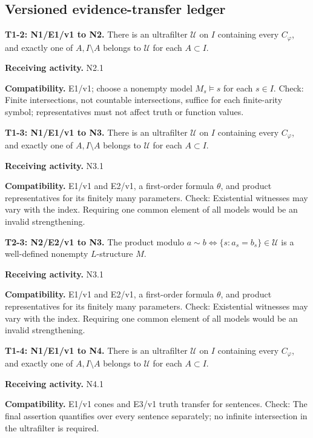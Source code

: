 \documentclass[preprint,12pt,aps,pra,showkeys,amsmath,amssymb,superscriptaddress,floatfix]{revtex4-2}
\theoremstyle{definition}
\theoremstyle{remark}
\newcommand{\field}[2]{\par\smallskip\noindent\textbf{#1.} #2\par}
\begin{document}
\clearpage\subsection{Versioned evidence-transfer ledger}

\begingroup\small\linespread{1.05}\selectfont

\field{T1-2: N1/E1/v1 to N2}{There is an ultrafilter \(\mathcal U\) on \(I\) containing every
\(C_\varphi\), and exactly one of \(A,I\setminus A\) belongs to
\(\mathcal U\) for each \(A\subset I\).}

\field{Receiving activity}{N2.1}

\field{Compatibility}{E1/v1; choose a nonempty model \(M_s\models s\) for each \(s\in I\).
Check: Finite intersections, not countable intersections, suffice for
each finite-arity symbol; representatives must not affect truth or
function values.}

\field{T1-3: N1/E1/v1 to N3}{There is an ultrafilter \(\mathcal U\) on \(I\) containing every
\(C_\varphi\), and exactly one of \(A,I\setminus A\) belongs to
\(\mathcal U\) for each \(A\subset I\).}

\field{Receiving activity}{N3.1}

\field{Compatibility}{E1/v1 and E2/v1, a first-order formula \(\theta\), and product
representatives for its finitely many parameters. Check: Existential
witnesses may vary with the index. Requiring one common element of all
models would be an invalid strengthening.}

\field{T2-3: N2/E2/v1 to N3}{The product modulo \(a\sim b\iff\{s:a_s=b_s\}\in\mathcal U\) is a
well-defined nonempty \(L\)-structure \(M\).}

\field{Receiving activity}{N3.1}

\field{Compatibility}{E1/v1 and E2/v1, a first-order formula \(\theta\), and product
representatives for its finitely many parameters. Check: Existential
witnesses may vary with the index. Requiring one common element of all
models would be an invalid strengthening.}

\field{T1-4: N1/E1/v1 to N4}{There is an ultrafilter \(\mathcal U\) on \(I\) containing every
\(C_\varphi\), and exactly one of \(A,I\setminus A\) belongs to
\(\mathcal U\) for each \(A\subset I\).}

\field{Receiving activity}{N4.1}

\field{Compatibility}{E1/v1 cones and E3/v1 truth transfer for sentences. Check: The final
assertion quantifies over every sentence separately; no infinite
intersection in the ultrafilter is required.}
\end{document}
